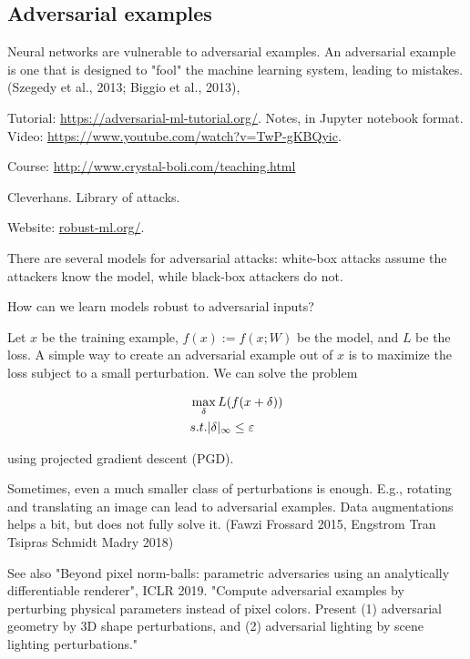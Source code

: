 \documentclass[english]{article}
\begin{document}
\subsection{Adversarial examples}
%
\bitem
\item Neural networks are vulnerable to adversarial examples. An adversarial example is one that is designed to "fool" the machine learning system, leading to mistakes. (Szegedy et al., 2013; Biggio et al., 2013),

Tutorial: \url{https://adversarial-ml-tutorial.org/}. Notes, in Jupyter notebook format. Video: \url{https://www.youtube.com/watch?v=TwP-gKBQyic}.

Course: \url{http://www.crystal-boli.com/teaching.html}


Cleverhans. Library of attacks. 

Website: \url{robust-ml.org/}.


\item There are several models for adversarial attacks: white-box attacks assume the attackers know the model, while black-box attackers do not. 

\item How can we learn models robust to adversarial inputs?

\item Let $x$ be the training example, $f(x):=f(x;W)$ be the model, and  $L$ be the loss. A simple way to create an adversarial example out of $x$ is to maximize the loss subject to a small perturbation. We can solve the problem 

\begin{align*}
&\max_\delta L(f(x+\delta))\\
&s.t. |\delta|_\infty \le \varepsilon
\end{align*}

using projected gradient descent (PGD).

\item Sometimes, even a much smaller class of perturbations is enough. E.g., rotating and translating an image can lead to adversarial examples. Data augmentations helps a bit, but does not fully solve it. (Fawzi Frossard 2015, Engstrom Tran Tsipras Schmidt Madry 2018) 

See also "Beyond pixel norm-balls: parametric adversaries using an analytically differentiable renderer", ICLR 2019. "Compute adversarial examples by perturbing physical parameters instead of pixel colors. Present (1) adversarial geometry by 3D shape perturbations, and (2) adversarial lighting by scene lighting perturbations."
\end{document}
